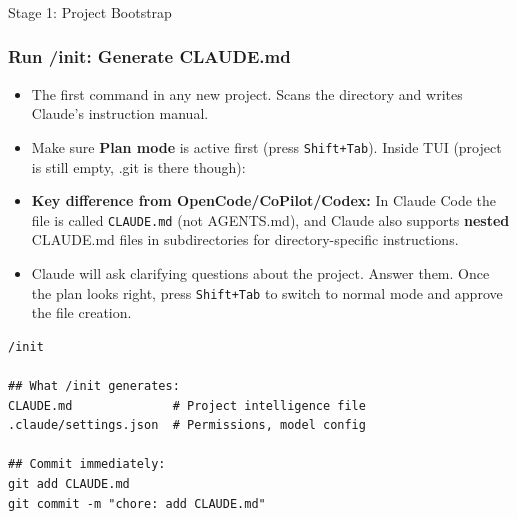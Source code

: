 






\begin{frame}[fragile]\frametitle{}
\begin{center}
{\Large Stage 1: Project Bootstrap}

\end{center}
\end{frame}


\begin{frame}[fragile]\frametitle{Run /init: Generate CLAUDE.md}
  \begin{itemize}
    \item The first command in any new project. Scans the directory and writes Claude's instruction manual.
    \item Make sure \textbf{Plan mode} is active first (press \texttt{Shift+Tab}). Inside TUI (project is still empty, .git is there though):
    \item \textbf{Key difference from OpenCode/CoPilot/Codex:} In Claude Code the file is called \texttt{CLAUDE.md} (not AGENTS.md), and Claude also supports \textbf{nested} CLAUDE.md files in subdirectories for directory-specific instructions.
    \item Claude will ask clarifying questions about the project. Answer them. Once the plan looks right, press \texttt{Shift+Tab} to switch to normal mode and approve the file creation.
\end{itemize}


\begin{lstlisting}
/init

## What /init generates:
CLAUDE.md              # Project intelligence file
.claude/settings.json  # Permissions, model config

## Commit immediately:
git add CLAUDE.md
git commit -m "chore: add CLAUDE.md"
\end{lstlisting}
\end{frame}


